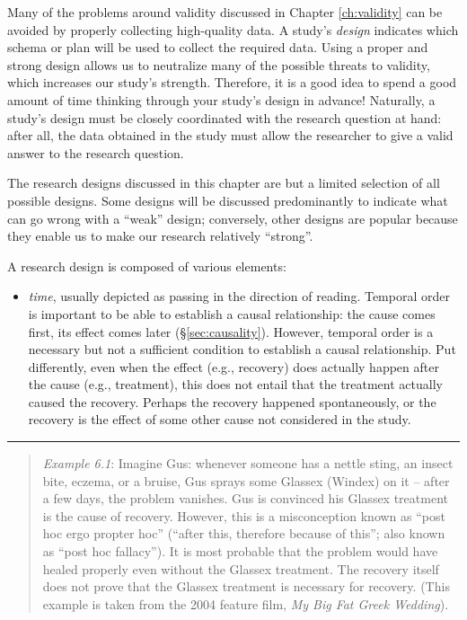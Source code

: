 \documentclass[
]{book}
\providecommand{\tightlist}{%
  \setlength{\itemsep}{0pt}\setlength{\parskip}{0pt}}
\begin{document}
Many of the problems around validity discussed in Chapter \ref{ch:validity} can be avoided by properly collecting high-quality data. A study's \emph{design} indicates which schema or plan will be used to collect the required data. Using a proper and strong design allows us to neutralize many of the possible threats to validity, which increases our study's strength. Therefore, it is a good idea to spend a good amount of time thinking through your study's design in advance! Naturally, a study's design must be closely coordinated with the research question at hand: after all, the data obtained in the study must allow the researcher to give a valid answer to the research question.

The research designs discussed in this chapter are but a limited selection of all possible designs. Some designs will be discussed predominantly to indicate what can go wrong with a ``weak'' design; conversely, other designs are popular because they enable us to make our research relatively ``strong''.

A research design is composed of various elements:

\begin{itemize}
\tightlist
\item
  \emph{time}, usually depicted as passing in the direction of reading. Temporal order is important to be able to establish a causal relationship: the cause comes first, its effect comes later (§\ref{sec:causality}). However, temporal order is a necessary but not a sufficient condition to establish a causal relationship. Put differently, even when the effect (e.g., recovery) does actually happen after the cause (e.g., treatment), this does not entail that the treatment actually caused the recovery. Perhaps the recovery happened spontaneously, or the recovery is the effect of some other cause not considered in the study.
\end{itemize}

\begin{center}\rule{0.5\linewidth}{0.5pt}\end{center}

\begin{quote}
\emph{Example 6.1}: Imagine Gus: whenever someone has a nettle sting, an insect bite, eczema, or a bruise, Gus sprays some Glassex (Windex) on it -- after a few days, the problem vanishes. Gus is convinced his Glassex treatment is the cause of recovery. However, this is a misconception known as ``post hoc ergo propter hoc'' (``after this, therefore because of this''; also known as ``post hoc fallacy''). It is most probable that the problem would have healed properly even without the Glassex treatment. The recovery itself does not prove that the Glassex treatment is necessary for recovery. (This example is taken from the 2004 feature film, \emph{My Big Fat Greek Wedding}).
\end{quote}
\end{document}

